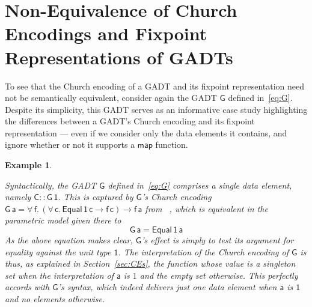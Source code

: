 \documentclass[submission,copyright,creativecommons]{eptcs}
\newtheorem{example}[thm]{Example}
\begin{document}
\section{Non-Equivalence of Church Encodings and 
    Fixpoint Representations of GADTs}\label{sec:non-equiv}

To see that the Church encoding of a GADT and its fixpoint
representation need not be semantically equivalent, consider again the
GADT $\mathsf{G}$ defined in~\eqref{eq:G}. Despite its simplicity,
this GADT serves as an informative case study highlighting the
differences between a GADT's Church encoding and its fixpoint
representation --- even if we consider only the data elements it
contains, and ignore whether or not it supports a $\mathsf{map}$
function.

\begin{example}\label{ex:g1}

Syntactically, the GADT $\mathsf{G}$ defined in~\eqref{eq:G} comprises
a single data element, namely $\mathsf{C :: G \, 1}$. This is captured
by $\mathsf{G}$'s Church encoding $\mathsf{G\,a} = \mathsf{\forall\,f.
  \, (\forall\,c.\, Equal\,1\,c \to f\,c) \to f\,a}$ from
~\cite{atk12}, which is equivalent in the parametric model given there
to
\[\mathsf{G\, a = Equal\,1\,a}\]
As the above equation makes clear,
$\mathsf{G}$'s
effect is simply to test its argument for equality against the unit
type $\mathsf{1}$. The interpretation of the Church encoding of
$\mathsf{G}$ is thus, as explained in Section~\ref{sec:CEs}, the
function whose value is a singleton set when the interpretation of
$\mathsf{a}$ is $1$ and the empty set otherwise. This perfectly
accords with $\mathsf{G}$'s syntax, which indeed delivers just one
data element when $\mathsf{a}$ is $\mathsf{1}$ and no elements
otherwise.


\end{example}
\end{document}
